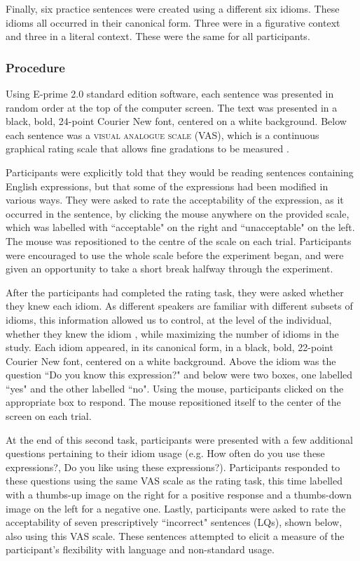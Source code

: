 \documentclass[output=paper
,modfonts
,nonflat]{langsci/langscibook}
\begin{document}
Finally, six practice sentences were created using a different six idioms. These idioms all occurred in their canonical form. Three were in a figurative context and three in a literal context. These were the same for all participants. 


\subsubsection{Procedure}

Using E-prime 2.0 standard edition software, each sentence was presented in random order at the top of the computer screen. The text was presented in a black, bold, 24-point Courier New font, centered on a white background. Below each sentence was a \textsc{visual analogue scale} (VAS), which is a continuous graphical rating scale that allows fine gradations to be measured \citep{FunkeReips2012}. 

Participants were explicitly told that they would be reading sentences containing English expressions, but that some of the expressions had been modified in various ways. They were asked to rate the acceptability of the expression, as it occurred in the sentence, by clicking the mouse anywhere on the provided scale, which was labelled with ``acceptable" on the right and ``unacceptable" on the left. The mouse was repositioned to the centre of the scale on each trial. Participants were encouraged to use the whole scale before the experiment began, and were given an opportunity to take a short break halfway through the experiment. 

After the participants had completed the rating task, they were asked whether they knew each idiom. As different speakers are familiar with different subsets of idioms, this information allowed us to control, at the level of the individual, whether they knew the idiom \citep{Cacciari2005}, while maximizing the number of idioms in the study. Each idiom appeared, in its canonical form, in a black, bold, 22-point Courier New font, centered on a white background. Above the idiom was the question ``Do you know this expression?" and below were two boxes, one labelled ``yes" and the other labelled ``no". Using the mouse, participants clicked on the appropriate box to respond. The mouse repositioned itself to the center of the screen on each trial.

At the end of this second task, participants were presented with a few additional questions pertaining to their idiom usage (e.g. How often do you use these expressions?, Do you like using these expressions?). Participants responded to these questions using the same VAS scale as the rating task, this time labelled with a thumbs-up image on the right for a positive response and a thumbs-down image on the left for a negative one. Lastly, participants were asked to rate the acceptability of seven prescriptively ``incorrect" sentences (LQs), shown below, also using this VAS scale. These sentences attempted to elicit a measure of the participant's flexibility with language and non-standard usage.\\
\end{document}
